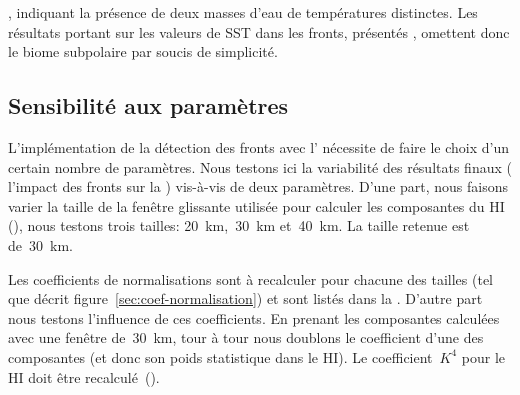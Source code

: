 , indiquant la présence de deux masses d'eau de températures distinctes.
Les résultats portant sur les valeurs de SST dans les fronts, présentés , omettent donc le biome subpolaire par soucis de simplicité.

\begin{figure}
  \centering
  \label{fig:verif-hist}
\end{figure}

\begin{figure}
  \centering
  \label{fig:hists-sst-latbands}
\end{figure}

\subsection{Sensibilité aux paramètres}
\label{sec:sensibilite-parametres}

L'implémentation de la détection des fronts avec l' nécessite de faire le choix d'un certain nombre de paramètres. Nous testons ici la variabilité des résultats finaux ( l'impact des fronts sur la ) vis-à-vis de deux paramètres.
D'une part, nous faisons varier la taille de la fenêtre glissante utilisée pour calculer les composantes du HI (), nous testons trois tailles: \qty{20}{\km},~\qty{30}{\km} et~\qty{40}{\km}. La taille retenue est de~\qty{30}{\km}.

Les coefficients de normalisations sont à recalculer pour chacune des tailles (tel que décrit figure~\ref{sec:coef-normalisation}) et sont listés dans la .
D'autre part nous testons l'influence de ces coefficients. En prenant les composantes calculées avec une fenêtre de~\qty{30}{\km}, tour à tour nous doublons le coefficient d'une des composantes (et donc son poids statistique dans le HI). Le coefficient~\(K^4\) pour le HI doit être recalculé~().

